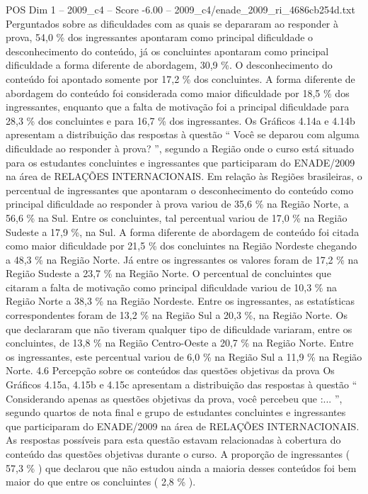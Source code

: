 \begin{textsample}{POS Dim 1 – 2009\_c4 – Score -6.00 – 2009\_c4/enade\_2009\_ri\_4686cb254d.txt}
Perguntados sobre as dificuldades com as quais se depararam ao responder à prova, 54,0 \% dos ingressantes apontaram como principal dificuldade o desconhecimento do conteúdo, já os concluintes apontaram como principal dificuldade a forma diferente de abordagem, 30,9 \%.
O desconhecimento do conteúdo foi apontado somente por 17,2 \% dos concluintes.
A forma diferente de abordagem do conteúdo foi considerada como maior dificuldade por 18,5 \% dos ingressantes, enquanto que a falta de motivação foi a principal dificuldade para 28,3 \% dos concluintes e para 16,7 \% dos ingressantes.
Os Gráficos 4.14a e 4.14b apresentam a distribuição das respostas à questão “ Você se deparou com alguma dificuldade ao responder à prova? ”, segundo a Região onde o curso está situado para os estudantes concluintes e ingressantes que participaram do ENADE/2009 na área de RELAÇÕES INTERNACIONAIS.
Em relação às Regiões brasileiras, o percentual de ingressantes que apontaram o desconhecimento do conteúdo como principal dificuldade ao responder à prova variou de 35,6 \% na Região Norte, a 56,6 \% na Sul.
Entre os concluintes, tal percentual variou de 17,0 \% na Região Sudeste a 17,9 \%, na Sul.
A forma diferente de abordagem de conteúdo foi citada como maior dificuldade por 21,5 \% dos concluintes na Região Nordeste chegando a 48,3 \% na Região Norte.
Já entre os ingressantes os valores foram de 17,2 \% na Região Sudeste a 23,7 \% na Região Norte.
O percentual de concluintes que citaram a falta de motivação como principal dificuldade variou de 10,3 \% na Região Norte a 38,3 \% na Região Nordeste.
Entre os ingressantes, as estatísticas correspondentes foram de 13,2 \% na Região Sul a 20,3 \%, na Região Norte.
Os que declararam que não tiveram qualquer tipo de dificuldade variaram, entre os concluintes, de 13,8 \% na Região Centro-Oeste a 20,7 \% na Região Norte.
Entre os ingressantes, este percentual variou de 6,0 \% na Região Sul a 11,9 \% na Região Norte. 4.6 Percepção sobre os conteúdos das questões objetivas da prova Os Gráficos 4.15a, 4.15b e 4.15c apresentam a distribuição das respostas à questão “ Considerando apenas as questões objetivas da prova, você percebeu que :... ”, segundo quartos de nota final e grupo de estudantes concluintes e ingressantes que participaram do ENADE/2009 na área de RELAÇÕES INTERNACIONAIS.
As respostas possíveis para esta questão estavam relacionadas à cobertura do conteúdo das questões objetivas durante o curso.
A proporção de ingressantes ( 57,3 \% ) que declarou que não estudou ainda a maioria desses conteúdos foi bem maior do que entre os concluintes ( 2,8 \% ).

\end{textsample}
